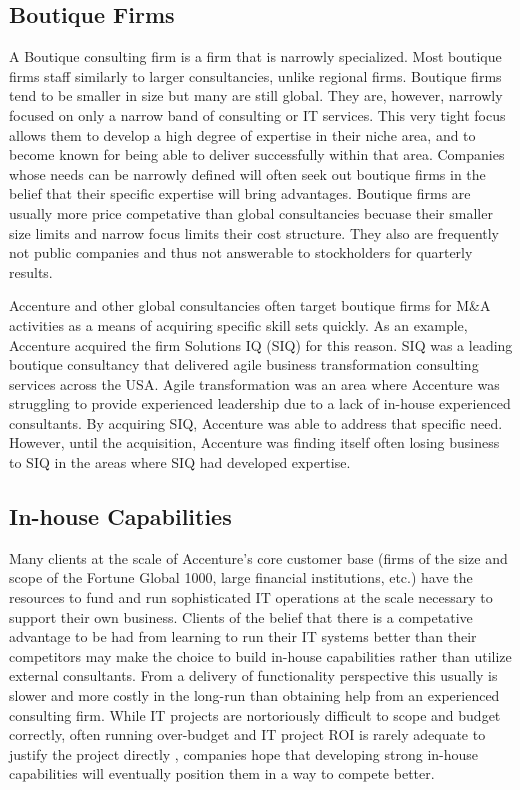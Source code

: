 \subsection{Boutique Firms}

A Boutique consulting firm is a firm that is narrowly specialized. Most boutique firms staff similarly to larger consultancies, unlike regional firms. Boutique firms tend to be smaller in size but many are still global. They are, however, narrowly focused on only a narrow band of consulting or IT services. This very tight focus allows them to develop a high degree of expertise in their niche area, and to become known for being able to deliver successfully within that area. Companies whose needs can be narrowly defined will often seek out boutique firms in the belief that their specific expertise will bring advantages. Boutique firms are usually more price competative than global consultancies becuase their smaller size limits and narrow focus limits their cost structure. They also are frequently not public companies and thus not answerable to stockholders for quarterly results.

Accenture and other global consultancies often target boutique firms for M\&A activities as a means of acquiring specific skill sets quickly. As an example, Accenture acquired the firm Solutions IQ (SIQ) for this reason. SIQ was a leading boutique consultancy that delivered agile business transformation consulting services across the USA. Agile transformation was an area where Accenture was struggling to provide experienced leadership due to a lack of in-house experienced consultants. By acquiring SIQ, Accenture was able to address that specific need. However, until the acquisition, Accenture was finding itself often losing business to SIQ in the areas where SIQ had developed expertise.

\subsection{In-house Capabilities}

Many clients at the scale of Accenture's core customer base (firms of the size and scope of the Fortune Global 1000, large financial institutions, etc.) have the resources to fund and run sophisticated IT operations at the scale necessary to support their own business. Clients of the belief that there is a competative advantage to be had from learning to run their IT systems better than their competitors may make the choice to build in-house capabilities rather than utilize external consultants. From a delivery of functionality perspective this usually is slower and more costly in the long-run than obtaining help from an experienced consulting firm. While IT projects are nortoriously difficult to scope and budget correctly, often running over-budget and IT project ROI is rarely adequate to justify the project directly \parencite{dossantosJustifyingInvestmentsNew1991}, companies hope that developing strong in-house capabilities will eventually position them in a way to compete better.

